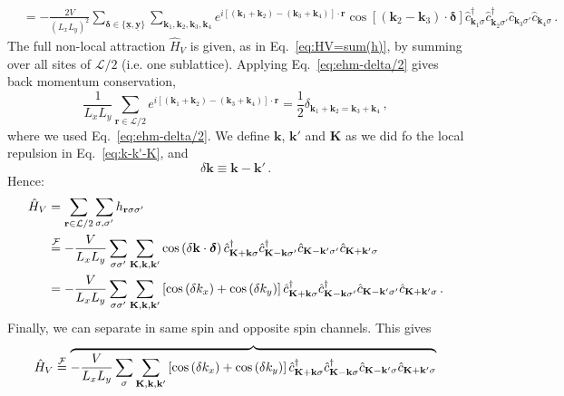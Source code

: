 \begin{tabproof}
\[\begin{aligned}
		&= -\frac{2V}{(L_xL_y)^2} \sum_{\bm{\delta}\in \lbrace \underline{\mathbf{x}}, \underline{\mathbf{y}} \rbrace} \sum_{\mathbf{k}_1,\mathbf{k}_2,\mathbf{k}_3,\mathbf{k}_4} e^{i \left[ (\mathbf{k}_1 + \mathbf{k}_2) - (\mathbf{k}_3 + \mathbf{k}_4) \right] \cdot \mathbf{r}} \cos\left[
		(\mathbf{k}_2-\mathbf{k}_3) \cdot \bm{\delta}
		\right]	\hat c_{\mathbf{k}_1 \sigma}^\dagger \hat c_{\mathbf{k}_2 \sigma'}^\dagger \hat c_{\mathbf{k}_3 \sigma'} \hat c_{\mathbf{k}_4\sigma} \, .
	\end{aligned}
	\]
	The full non-local attraction $\hat H_V$ is given, as in Eq.~\eqref{eq:HV=sum(h)}, by summing over all sites of $\mathcal{L}/2$ (i.e. one sublattice). Applying Eq.~\eqref{eq:ehm-delta/2} gives back momentum conservation,
	\[
		\frac{1}{L_xL_y} \sum_{\mathbf{r} \in \mathcal{L}/2} e^{i \left[ (\mathbf{k}_1 + \mathbf{k}_2) - (\mathbf{k}_3 + \mathbf{k}_4) \right] \cdot \mathbf{r}} = \frac{1}{2} \delta_{\mathbf{k}_1 + \mathbf{k}_2 = \mathbf{k}_3 + \mathbf{k}_4} \, ,
	\]
	where we used Eq.~\eqref{eq:ehm-delta/2}. We define $\mathbf{k}$, $\mathbf{k}'$ and $\mathbf{K}$ as we did fo the local repulsion in Eq.~\eqref{eq:k-k'-K}, and
	\[
		\delta \mathbf{k} \equiv \mathbf{k}-\mathbf{k}' \, .
	\]
	Hence:
	\begin{align}
		\hat H_V &= \sum_{\mathbf{r} \in \mathcal{L}/2} \sum_{\sigma,\sigma'} h_{\mathbf{r}\sigma\sigma'} \nonumber \\
		&\stackrel{\mathcal{F}}{=} - \frac{V}{L_x L_y} \sum_{\sigma\sigma'} \sum_{\mathbf{K}, \mathbf{k}, \mathbf{k}'} \cos\left(
		\delta \mathbf{k} \cdot \bm{\delta}
		\right)	\hat c_{\mathbf{K}+\mathbf{k} \sigma}^\dagger \hat c_{\mathbf{K}-\mathbf{k} \sigma'}^\dagger \hat c_{\mathbf{K}-\mathbf{k}' \sigma'} \hat c_{\mathbf{K}+\mathbf{k}'\sigma} \nonumber \\
		&= - \frac{V}{L_x L_y} 	\sum_{\sigma\sigma'}
		\sum_{\mathbf{K}, \mathbf{k}, \mathbf{k}'} \left[
		\cos \left(
		\delta k_x
		\right)	+ \cos \left(
		\delta k_y
		\right)	
		\right]	\hat c_{\mathbf{K}+\mathbf{k} \sigma}^\dagger \hat c_{\mathbf{K}-\mathbf{k} \sigma'}^\dagger \hat c_{\mathbf{K}-\mathbf{k}' \sigma'} \hat c_{\mathbf{K}+\mathbf{k}'\sigma} \, . \label{eq:HV-fourier}
	\end{align}
	Finally, we can separate in same spin and opposite spin channels. This gives
	\begin{multline*}
		\hat H_V \stackrel{\mathcal{F}}{=} 
		\overbrace{
			- \frac{V}{L_x L_y} \sum_{\sigma}
			\sum_{\mathbf{K}, \mathbf{k}, \mathbf{k}'} \left[
			\cos \left(
			\delta k_x
			\right)	+ \cos \left(
			\delta k_y
			\right)	
			\right]	\hat c_{\mathbf{K}+\mathbf{k} \sigma}^\dagger \hat c_{\mathbf{K}-\mathbf{k}\sigma}^\dagger \hat c_{\mathbf{K}-\mathbf{k}'\sigma} \hat c_{\mathbf{K}+\mathbf{k}'\sigma}
}
\end{multline*}
\end{tabproof}
